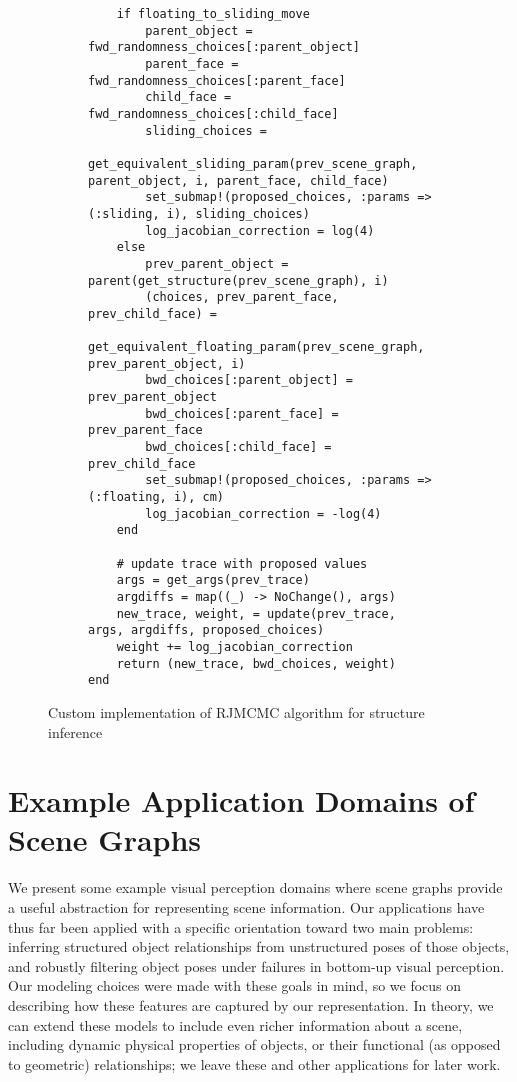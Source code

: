 \begin{figure}[H]
\begin{subfigure}{\textwidth}
\begin{lstlisting}
    if floating_to_sliding_move
        parent_object = fwd_randomness_choices[:parent_object]
        parent_face = fwd_randomness_choices[:parent_face]
        child_face = fwd_randomness_choices[:child_face]
        sliding_choices =
            get_equivalent_sliding_param(prev_scene_graph, parent_object, i, parent_face, child_face)
        set_submap!(proposed_choices, :params => (:sliding, i), sliding_choices)
        log_jacobian_correction = log(4)
    else
        prev_parent_object = parent(get_structure(prev_scene_graph), i)
        (choices, prev_parent_face, prev_child_face) =
            get_equivalent_floating_param(prev_scene_graph, prev_parent_object, i)
        bwd_choices[:parent_object] = prev_parent_object
        bwd_choices[:parent_face] = prev_parent_face
        bwd_choices[:child_face] = prev_child_face
        set_submap!(proposed_choices, :params => (:floating, i), cm)
        log_jacobian_correction = -log(4)
    end

    # update trace with proposed values
    args = get_args(prev_trace)
    argdiffs = map((_) -> NoChange(), args)
    new_trace, weight, = update(prev_trace, args, argdiffs, proposed_choices)
    weight += log_jacobian_correction
    return (new_trace, bwd_choices, weight)
end
\end{lstlisting}
\end{subfigure}

\caption{Custom implementation of RJMCMC algorithm for structure inference}
\label{fig:inference}
\end{figure}


\section{Example Application Domains of Scene Graphs}
We present some example visual perception domains where scene graphs provide a useful abstraction for representing scene information.
Our applications have thus far been applied with a specific orientation toward two main problems: inferring structured object relationships from unstructured poses of those objects, and robustly filtering object poses under failures in bottom-up visual perception.
Our modeling choices were made with these goals in mind, so we focus on describing how these features are captured by our representation.
In theory, we can extend these models to include even richer information about a scene, including dynamic physical properties of objects, or their functional (as opposed to geometric) relationships; we leave these and other applications for later work.

